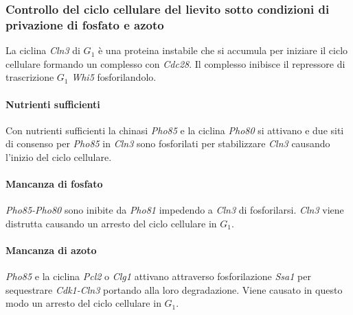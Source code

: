 		\subsubsection{Controllo del ciclo cellulare del lievito sotto condizioni di privazione di fosfato e azoto}
		La ciclina \emph{Cln3} di $G_1$ \`e una proteina instabile che si accumula per iniziare il ciclo cellulare formando un complesso con \emph{Cdc28}. 
		Il complesso inibisce il repressore di trascrizione $G_1$ \emph{Whi5} fosforilandolo.
			
			\paragraph{Nutrienti sufficienti}
			Con nutrienti sufficienti la chinasi \emph{Pho85} e la ciclina \emph{Pho80} si attivano e due siti di consenso per \emph{Pho85} in \emph{Cln3} sono fosforilati per stabilizzare \emph{Cln3} causando l'inizio del ciclo cellulare.
			
			\paragraph{Mancanza di fosfato}
			\emph{Pho85-Pho80} sono inibite da \emph{Pho81} impedendo a \emph{Cln3} di fosforilarsi.
			\emph{Cln3} viene distrutta causando un arresto del ciclo cellulare in $G_1$.

			\paragraph{Mancanza di azoto}
			\emph{Pho85} e la ciclina \emph{Pcl2} o \emph{Clg1} attivano attraverso fosforilazione \emph{Ssa1} per sequestrare \emph{Cdk1-Cln3} portando alla loro degradazione.
			Viene causato in questo modo un arresto del ciclo cellulare in $G_1$. 
			
